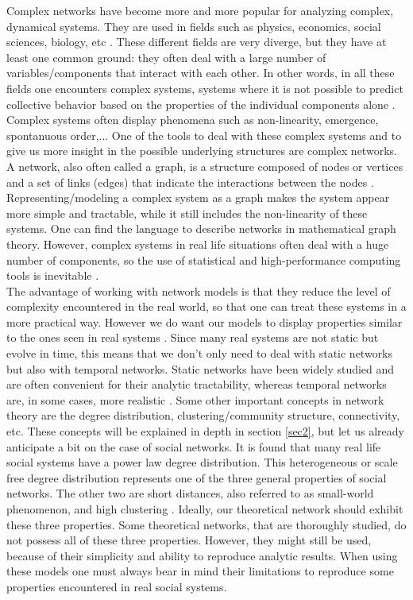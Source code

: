 \documentclass[11 pt , letterpaper , twoside , openright]{book}
\begin{document}
Complex networks have become more and more popular for analyzing complex, dynamical systems. They are used in fields such as physics, economics, social sciences, biology, etc \cite{Costa2008}. These different fields are very diverge, but they have at least one common ground: they often deal with a large number of variables/components that interact with each other. In other words, in all these fields one encounters complex systems, systems where it is not possible to predict collective behavior based on the properties of the individual components alone \cite{Mata2020}. Complex systems often display phenomena such as non-linearity, emergence, spontanuous order,... %
One of the tools to deal with these complex systems and to give us more insight in the possible underlying structures are complex networks. A network, also often called a graph, is a structure composed of nodes or vertices and a set of links (edges) that indicate the interactions between the nodes \cite{Mata2020}. Representing/modeling a complex system as a graph makes the system appear more simple and tractable, while it still includes the non-linearity of these systems. One can find the language to describe networks in mathematical graph theory. However, complex systems in real life situations often deal with a huge number of components, so the use of statistical and high-performance computing tools is inevitable \cite{Mata2020}.\\
The advantage of working with network models is that they reduce the level of complexity encountered in the real world, so that one can treat these systems in a more practical way. However we do want our models to display properties similar to the ones seen in real systems \cite{Mata2020}. Since many real systems are not static but evolve in time, this means that we don't only need to deal with static networks but also with temporal networks. Static networks have been widely studied and are often convenient for their analytic tractability, whereas temporal networks are, in some cases, more realistic \cite{Mata2020}. Some other important concepts in network theory are the degree distribution, clustering/community structure, connectivity, etc. These concepts will be explained in depth in section \ref{sec2}, but let us already anticipate a bit on the case of social networks. It is found that many real life social systems have a power law degree distribution. This heterogeneous or scale free degree distribution represents one of the three general properties of social networks. The other two are short distances, also referred to as small-world phenomenon, and high clustering \cite{Muchnik2013}. Ideally, our theoretical network should exhibit these three properties. Some theoretical networks, that are thoroughly studied, do not possess all of these three properties. However, they might still be used, because of their simplicity and ability to reproduce analytic results. When using these models one must always bear in mind their limitations to reproduce some properties encountered in real social systems. \\
\end{document}
